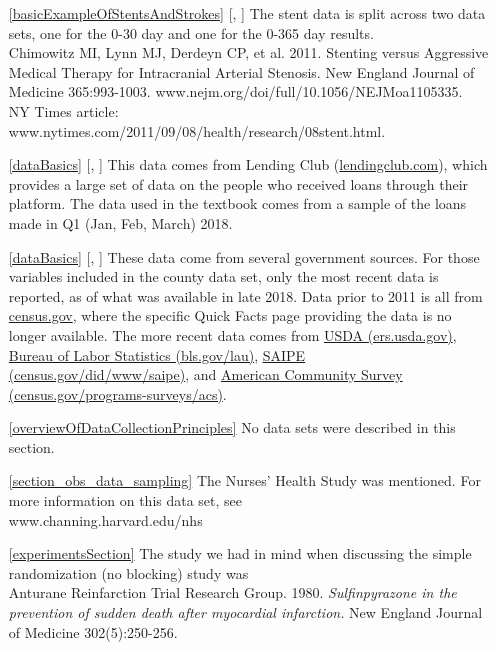 \begin{itemize}
\item[\ref{basicExampleOfStentsAndStrokes}]
    [\datalink{stent30}, \datalink{stent365}]
    The stent data is split across two data sets,
    one for the 0-30 day and one for the 0-365 day results. \\
    Chimowitz MI, Lynn MJ, Derdeyn CP, et al. 2011.
    Stenting versus Aggressive Medical Therapy for
    Intracranial Arterial Stenosis.
    New England Journal of Medicine 365:993-1003.
        {www.nejm.org/doi/full/10.1056/NEJMoa1105335}. \\
    NY Times article:
        {www.nytimes.com/2011/09/08/health/research/08stent.html}.

\item[\ref{dataBasics}]
    [\datalink{loan50}, \datalink{loans\_full\_schema}]
    This data comes from Lending Club
    (\href{https://www.lendingclub.com/info/download-data.action}
        {lendingclub.com}),
    which provides a large set of data on the people who
    received loans through their platform.
    The data used in the textbook comes from a sample
    of the loans made in Q1 (Jan, Feb, March) 2018.
\item[\ref{dataBasics}]
    [\datalink{county}, \datalink{county\_complete}]
    These data come from several government sources.
    For those variables included in the
    county data set, only the most recent data is reported,
    as of what was available in late 2018.
    Data prior to 2011 is all from
    \href{http://census.gov}{census.gov},
    where the specific Quick Facts page providing the data
    is no longer available.
    The more recent data comes from
    \href{https://www.ers.usda.gov/data-products/county-level-data-sets/download-data/}
        {USDA (ers.usda.gov)},
    \href{https://www.bls.gov/lau/}
        {Bureau of Labor Statistics (bls.gov/lau)},
    \href{https://www.census.gov/did/www/saipe/}
        {SAIPE (census.gov/did/www/saipe)},
    and
    \href{https://www.census.gov/programs-surveys/acs/}
        {American Community Survey
            (census.gov/programs-surveys/acs)}.

\item[\ref{overviewOfDataCollectionPrinciples}]
    No data sets were described in this section.

\item[\ref{section_obs_data_sampling}]
    The Nurses' Health Study was mentioned.
    For more information on this data set, see \\
        {www.channing.harvard.edu/nhs}

\item[\ref{experimentsSection}]
    The study we had in mind when discussing the
    simple randomization (no blocking) study was \\
    Anturane Reinfarction Trial Research Group. 1980.
    \emph{Sulfinpyrazone in the prevention of sudden
    death after myocardial infarction.}
    New England Journal of Medicine 302(5):250-256.
\end{itemize}

